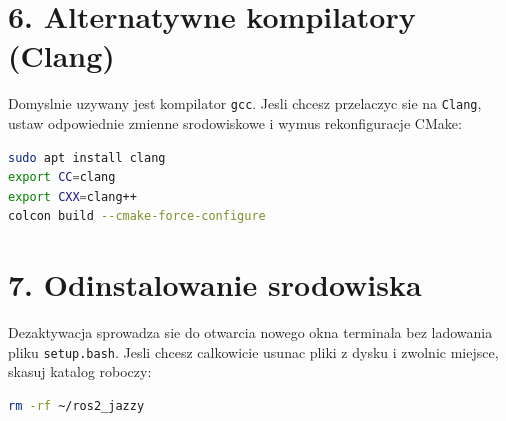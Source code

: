 \documentclass[11pt,a4paper]{article}
\begin{document}
\section{\color{techgreen}6. Alternatywne kompilatory (Clang)}
Domyslnie uzywany jest kompilator \texttt{gcc}. Jesli chcesz przelaczyc sie na \texttt{Clang}, ustaw odpowiednie zmienne srodowiskowe i wymus rekonfiguracje CMake:

\begin{lstlisting}[language=bash]
sudo apt install clang
export CC=clang
export CXX=clang++
colcon build --cmake-force-configure
\end{lstlisting}

\section{\color{techgreen}7. Odinstalowanie srodowiska}
Dezaktywacja sprowadza sie do otwarcia nowego okna terminala bez ladowania pliku \texttt{setup.bash}. Jesli chcesz calkowicie usunac pliki z dysku i zwolnic miejsce, skasuj katalog roboczy:

\begin{lstlisting}[language=bash]
rm -rf ~/ros2_jazzy
\end{lstlisting}
\end{document}
